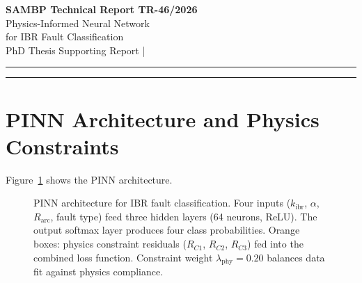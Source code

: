 \documentclass[11pt,a4paper]{article}
\begin{document}
\begin{center}
  {\LARGE\bfseries\color{sambpblue} SAMBP Technical Report TR-46/2026}\\[6pt]
  {\large Physics-Informed Neural Network\\
    for IBR Fault Classification}\\[10pt]
  {\normalsize PhD Thesis Supporting Report \quad|}
\end{center}

\vspace{2pt}\hrule\vspace{8pt}

\begin{abstract}
\noindent
This report develops a physics-informed neural network (PINN) for classifying
IBR line faults into four protection outcomes: structural miss, 87L-only, Z1
(quadrilateral), and external.  The PINN embeds three hard protection-physics
constraints into the loss function (C1: $k<0.06\Rightarrow\text{MISS}$;
C2: $k\geq0.10,\,\alpha\leq0.80\Rightarrow$Z1/87L; C3: $\alpha>1.0\Rightarrow$
EXT) with constraint weight $\lambda_\mathrm{phy}=0.20$.  Trained on 2000
synthetic MC samples, the PINN achieves 93.6\% overall accuracy vs 85.8\% for
a pure data-driven baseline.  Physics constraint violation rate is 1.0\% vs
11.0\% for the baseline --- a 91\% reduction.  In the critical threshold
boundary region ($k\in[0.045,0.075]$), the PINN achieves 99\% accuracy vs
75\% for the baseline (+24\,pp), demonstrating that physics regularisation
provides the largest benefit precisely where data-driven models are least
reliable.
\end{abstract}

\vspace{4pt}\hrule\vspace{10pt}

\section{PINN Architecture and Physics Constraints}
\label{sec:arch}

Figure~\ref{fig:arch} shows the PINN architecture.

\begin{figure}[htbp]
  \centering
  \resizebox{0.96\textwidth}{!}{}
  \caption{PINN architecture for IBR fault classification.  Four inputs
           ($k_\mathrm{ibr}$, $\alpha$, $R_\mathrm{arc}$, fault type) feed
           three hidden layers (64 neurons, ReLU).  The output softmax layer
           produces four class probabilities.  Orange boxes: physics constraint
           residuals ($R_{C1}$, $R_{C2}$, $R_{C3}$) fed into the combined
           loss function.  Constraint weight $\lambda_\mathrm{phy}=0.20$
           balances data fit against physics compliance.}
  \label{fig:arch}
\end{figure}
\end{document}
